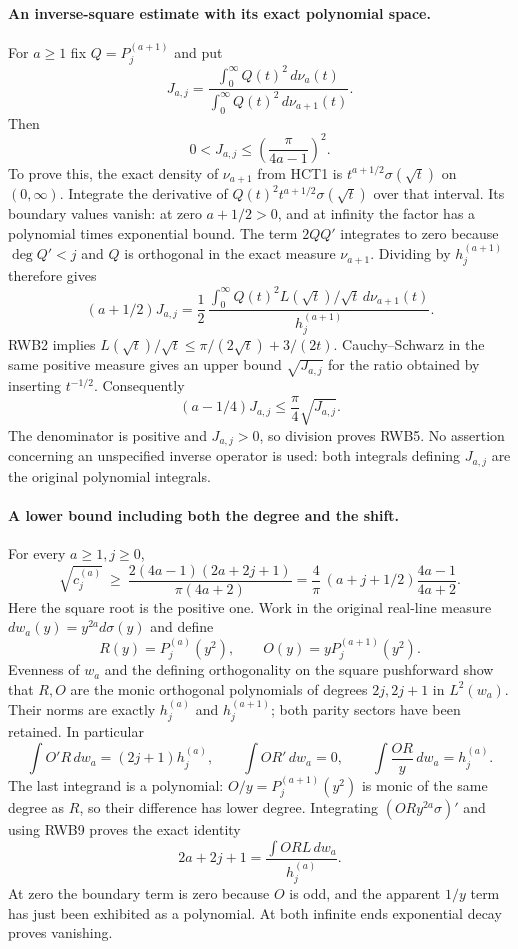 \paragraph{An inverse-square estimate with its exact polynomial space.}
For $a\ge1$ fix $Q=P_j^{(a+1)}$ and put
\[
 J_{a,j}=
 \frac{\int_0^\infty Q(t)^2\,d\nu_a(t)}
      {\int_0^\infty Q(t)^2\,d\nu_{a+1}(t)}.
\]
Then
\[
 0<J_{a,j}\le\left(\frac{\pi}{4a-1}\right)^2.
 \tag{RWB5}
\]
To prove this, the exact density of $\nu_{a+1}$ from HCT1 is
$t^{a+1/2}\sigma(\sqrt t)$ on $(0,\infty)$. Integrate the derivative
of $Q(t)^2t^{a+1/2}\sigma(\sqrt t)$ over that interval. Its boundary
values vanish: at zero $a+1/2>0$, and at infinity the factor has a
polynomial times exponential bound. The term $2QQ'$ integrates to
zero because $\deg Q'<j$ and $Q$ is orthogonal in the exact measure
$\nu_{a+1}$. Dividing by $h_j^{(a+1)}$ therefore gives
\[
 (a+1/2)J_{a,j}
 =\frac12\,\frac{\int_0^\infty
                 Q(t)^2 L(\sqrt t)/\sqrt t\,d\nu_{a+1}(t)}
                    {h_j^{(a+1)}}.
 \tag{RWB6}
\]
RWB2 implies $L(\sqrt t)/\sqrt t\le
\pi/(2\sqrt t)+3/(2t)$. Cauchy--Schwarz in the same positive measure
gives an upper bound $\sqrt{J_{a,j}}$ for the ratio obtained by
inserting $t^{-1/2}$. Consequently
\[
 (a-1/4)J_{a,j}\le\frac\pi4\sqrt{J_{a,j}}.
\]
The denominator is positive and $J_{a,j}>0$, so division proves RWB5.
No assertion concerning an unspecified inverse operator is used: both
integrals defining $J_{a,j}$ are the original polynomial integrals.

\paragraph{A lower bound including both the degree and the shift.}
For every $a\ge1,j\ge0$,
\[
 \boxed{\displaystyle
 \sqrt{c_j^{(a)}}\ \ge\
 \frac{2(4a-1)(2a+2j+1)}{\pi(4a+2)}
 =\frac4\pi\,(a+j+1/2)\frac{4a-1}{4a+2}.}
 \tag{RWB7}
\]
Here the square root is the positive one. Work in the original
real-line measure $dw_a(y)=y^{2a}d\sigma(y)$ and define
\[
 R(y)=P_j^{(a)}(y^2),\qquad
 O(y)=yP_j^{(a+1)}(y^2).
 \tag{RWB8}
\]
Evenness of $w_a$ and the defining orthogonality on the square
pushforward show that $R,O$ are the monic orthogonal polynomials of
degrees $2j,2j+1$ in $L^2(w_a)$. Their norms are exactly
$h_j^{(a)}$ and $h_j^{(a+1)}$; both parity sectors have been retained.
In particular
\[
 \int O'R\,dw_a=(2j+1)h_j^{(a)},\qquad
 \int OR'\,dw_a=0,\qquad
 \int\frac{OR}{y}\,dw_a=h_j^{(a)}.
 \tag{RWB9}
\]
The last integrand is a polynomial: $O/y=P_j^{(a+1)}(y^2)$ is monic
of the same degree as $R$, so their difference has lower degree.
Integrating $(ORy^{2a}\sigma)'$ and using RWB9 proves the exact identity
\[
 2a+2j+1=\frac{\int OR L\,dw_a}{h_j^{(a)}}.
 \tag{RWB10}
\]
At zero the boundary term is zero because $O$ is odd, and the apparent
$1/y$ term has just been exhibited as a polynomial. At both infinite
ends exponential decay proves vanishing.

